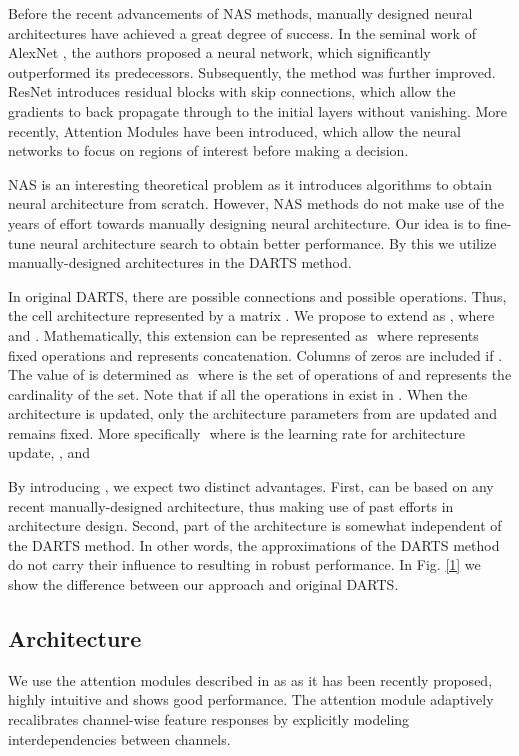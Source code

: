 \documentclass[10pt,a4paper,conference]{IEEEtran}
\begin{document}
Before the recent advancements of NAS methods, manually designed neural architectures have achieved a great degree of success. In the seminal work of AlexNet \cite{krizhevsky2012imagenet:55}, the authors proposed a neural network, which significantly outperformed its predecessors. Subsequently, the method was further improved. ResNet \cite{7780459:61} introduces residual blocks with skip connections, which allow the gradients to back propagate through to the initial layers without vanishing. More recently, Attention Modules \cite{hu2018squeeze:20} have been introduced, which allow the neural networks to focus on regions of interest before making a decision.
​


NAS is an interesting theoretical problem as it introduces algorithms to obtain neural architecture from scratch. However, NAS methods do not make use of the years of effort towards manually designing neural architecture. Our idea is to fine-tune neural architecture search to obtain better performance. By this we utilize manually-designed architectures in the DARTS method.
​


In original DARTS, there are  possible connections and  possible operations. Thus, the cell architecture represented by a matrix . We propose to extend  as , where  and . Mathematically, this extension can be represented as
​
where  represents fixed operations and  represents concatenation. Columns of zeros are included if . The value of  is determined as
​
where  is the set of operations of  and  represents the cardinality of the set. Note that  if all the operations in  exist in .
When the architecture  is updated, only the architecture parameters from  are updated and  remains fixed. More specifically
​
where  is the learning rate for architecture update, ,  and 
​


By introducing , we expect two distinct advantages. First,  can be based on any recent manually-designed architecture, thus making use of past efforts in architecture design. Second, part of the architecture is somewhat independent of the DARTS method. In other words, the approximations of the DARTS method do not carry their influence to  resulting in robust performance. In Fig. \ref{1} we show the difference between our approach and original DARTS.

\subsection{Architecture}
 We use the attention modules described in \cite{hu2018squeeze:20} as  as it has been recently proposed, highly intuitive and shows good performance. The attention module adaptively recalibrates channel-wise feature responses by explicitly modeling interdependencies between channels. 
 
\end{document}
